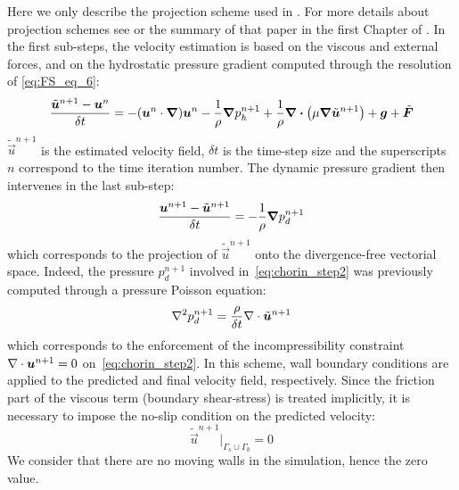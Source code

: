 Here we only describe the projection scheme used in .
For more details about projection schemes see \cite{Guermond2006} or the summary of that paper in the first Chapter of \cite{Leroy2014}.
In the first sub-steps, the velocity estimation is based on the viscous and external forces, and on the hydrostatic pressure gradient computed through the resolution of \eqref{eq:FS_eq_6}:
\begin{equation}\label{eq:chorin_step1}
  \displaystyle{\dfrac{\tilde{\bm{u}}^{n+1}-\bm{u}^n}{\delta t}}= - (\bm{u}^n \cdot \bm{\nabla}) \bm{u}^n -\dfrac{1}{\rho} \bm{\nabla} p_h^{n+1}
  + \dfrac{1}{\rho} \bm{\nabla \cdot} \left(\mu \bm{\nabla} \tilde{\bm{u}}^{n+1} \right)+ \bm{g} + \tilde{\bm{F}}\\
\end{equation}
$\tilde{\vec{u}}^{n+1}$ is the estimated velocity field, $\delta t$ is the time-step size and the superscripts $n$ correspond to the time iteration number.
The dynamic pressure gradient then intervenes in the last sub-step:
\begin{equation}\label{eq:chorin_step2}
  \displaystyle{\dfrac{\bm{u}^{n+1}-\tilde{\bm{u}}^{n+1}}{\delta t}}=-\dfrac{1}{\rho} \bm{\nabla} p_d^{n+1}
\end{equation}
which corresponds to the projection of $\tilde{\vec{u}}^{n+1}$ onto the divergence-free vectorial space.
Indeed, the pressure $p_d^{n+1}$ involved in~\eqref{eq:chorin_step2} was previously computed through a pressure Poisson equation:
\begin{equation}
  \label{eq:poisson}
  \nabla^2 p_d^{n+1}=\dfrac{\rho}{\delta t}\nabla \cdot \tilde{\bm{u}}^{n+1}
\end{equation}
which corresponds to the enforcement of the incompressibility constraint \mbox{$\nabla \cdot \bm{u}^{n+1}=0 $} on~\eqref{eq:chorin_step2}.
In this scheme, wall boundary conditions are applied to the predicted and final velocity field, respectively.
Since the friction part of the viscous term (boundary shear-stress) is treated implicitly, it is necessary to impose the
no-slip condition on the predicted velocity:
\begin{equation}\label{eq:ChorinBCs}
      \tilde{\vec{u}}^{n+1}|_{\Gamma_s\cup\Gamma_b} = 0
\end{equation}
We consider that there are no moving walls in the simulation, hence the zero value.
